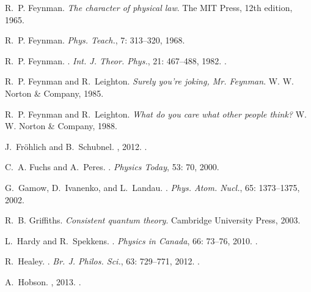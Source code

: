 \documentclass[a4paper,12pt]{article}
\begin{document}
\begin{thebibliography}{63}
R.~P. Feynman.
\newblock \emph{{The character of physical law}}.
\newblock The MIT Press, 12th edition, 1965.

R.~P. Feynman.
\newblock \emph{Phys. Teach.}, 7: 313--320, 1968.

R.~P. Feynman.
.
\newblock \emph{Int. J. Theor. Phys.}, 21: 467--488, 1982.
.

R.~P. Feynman and R.~Leighton.
\newblock \emph{{Surely you're joking, Mr. Feynman}}.
\newblock W. W. Norton \& Company, 1985.

R.~P. Feynman and R.~Leighton.
\newblock \emph{{What do you care what other people think?}}
\newblock W. W. Norton \& Company, 1988.

J.~Fr\"{o}hlich and B.~Schubnel.
, 2012.
.

C.~A. Fuchs and A.~Peres.
.
\newblock \emph{Physics Today}, 53: 70, 2000.

G.~Gamow, D.~Ivanenko, and L.~Landau.
.
\newblock \emph{Phys. Atom. Nucl.}, 65: 1373--1375, 2002.

R.~B. Griffiths.
\newblock \emph{{Consistent quantum theory}}.
\newblock Cambridge University Press, 2003.

L.~Hardy and R.~Spekkens.
.
\newblock \emph{Physics in Canada}, 66: 73--76, 2010.
.

R.~Healey.
.
\newblock \emph{Br. J. Philos. Sci.}, 63: 729--771, 2012.
.

A.~Hobson.
, 2013.
.


\end{thebibliography}
\end{document}
